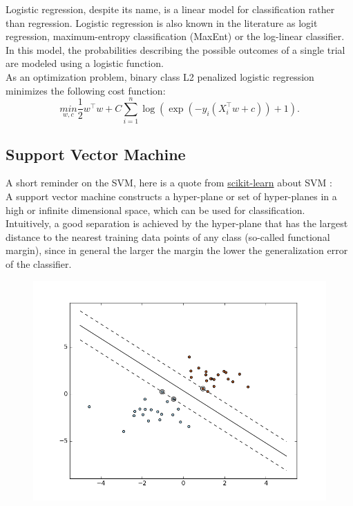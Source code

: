 		Logistic regression, despite its name, is a linear model for classification rather than regression. Logistic regression is also known in the literature as logit regression, maximum-entropy classification (MaxEnt) or the log-linear classifier. In this model, the probabilities describing the possible outcomes of a single trial are modeled using a logistic function.\\

		As an optimization problem, binary class L2 penalized logistic regression minimizes the following cost function:
		$$\underset{w,c}{min}\frac{1}{2}w^\intercal w+C\sum_{i=1}^{n}\log{(\exp{(-y_i(X^\intercal_{i} w+c))}+1)}.$$
	\subsection{Support Vector Machine}
	\label{ssec:svm}
		A short reminder on the SVM, here is a quote from \href{http://scikit-learn.org/stable/modules/svm.html}{scikit-learn} about SVM :\\

		A support vector machine constructs a hyper-plane or set of hyper-planes in a high or infinite dimensional space, which can be used for classification. Intuitively, a good separation is achieved by the hyper-plane that has the largest distance to the nearest training data points of any class (so-called functional margin), since in general the larger the margin the lower the generalization error of the classifier.
		\begin{figure}[h]
			\centering
			\includegraphics[width=\textwidth]{images/hyperplane.png}
			\label{fig:hyperplane}
		\end{figure}

